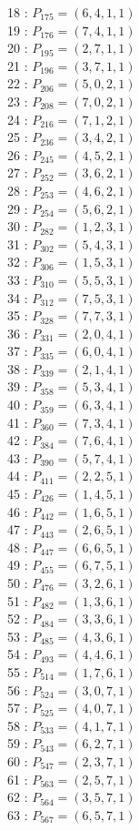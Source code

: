 \documentclass{article}
\begin{document}
{\begin{multicols}{2}
18 : $P_{175}=( 6, 4, 1, 1 )$\\
19 : $P_{176}=( 7, 4, 1, 1 )$\\
20 : $P_{195}=( 2, 7, 1, 1 )$\\
21 : $P_{196}=( 3, 7, 1, 1 )$\\
22 : $P_{206}=( 5, 0, 2, 1 )$\\
23 : $P_{208}=( 7, 0, 2, 1 )$\\
24 : $P_{216}=( 7, 1, 2, 1 )$\\
25 : $P_{236}=( 3, 4, 2, 1 )$\\
26 : $P_{245}=( 4, 5, 2, 1 )$\\
27 : $P_{252}=( 3, 6, 2, 1 )$\\
28 : $P_{253}=( 4, 6, 2, 1 )$\\
29 : $P_{254}=( 5, 6, 2, 1 )$\\
30 : $P_{282}=( 1, 2, 3, 1 )$\\
31 : $P_{302}=( 5, 4, 3, 1 )$\\
32 : $P_{306}=( 1, 5, 3, 1 )$\\
33 : $P_{310}=( 5, 5, 3, 1 )$\\
34 : $P_{312}=( 7, 5, 3, 1 )$\\
35 : $P_{328}=( 7, 7, 3, 1 )$\\
36 : $P_{331}=( 2, 0, 4, 1 )$\\
37 : $P_{335}=( 6, 0, 4, 1 )$\\
38 : $P_{339}=( 2, 1, 4, 1 )$\\
39 : $P_{358}=( 5, 3, 4, 1 )$\\
40 : $P_{359}=( 6, 3, 4, 1 )$\\
41 : $P_{360}=( 7, 3, 4, 1 )$\\
42 : $P_{384}=( 7, 6, 4, 1 )$\\
43 : $P_{390}=( 5, 7, 4, 1 )$\\
44 : $P_{411}=( 2, 2, 5, 1 )$\\
45 : $P_{426}=( 1, 4, 5, 1 )$\\
46 : $P_{442}=( 1, 6, 5, 1 )$\\
47 : $P_{443}=( 2, 6, 5, 1 )$\\
48 : $P_{447}=( 6, 6, 5, 1 )$\\
49 : $P_{455}=( 6, 7, 5, 1 )$\\
50 : $P_{476}=( 3, 2, 6, 1 )$\\
51 : $P_{482}=( 1, 3, 6, 1 )$\\
52 : $P_{484}=( 3, 3, 6, 1 )$\\
53 : $P_{485}=( 4, 3, 6, 1 )$\\
54 : $P_{493}=( 4, 4, 6, 1 )$\\
55 : $P_{514}=( 1, 7, 6, 1 )$\\
56 : $P_{524}=( 3, 0, 7, 1 )$\\
57 : $P_{525}=( 4, 0, 7, 1 )$\\
58 : $P_{533}=( 4, 1, 7, 1 )$\\
59 : $P_{543}=( 6, 2, 7, 1 )$\\
60 : $P_{547}=( 2, 3, 7, 1 )$\\
61 : $P_{563}=( 2, 5, 7, 1 )$\\
62 : $P_{564}=( 3, 5, 7, 1 )$\\
63 : $P_{567}=( 6, 5, 7, 1 )$\\
\end{multicols}
}
\end{document}
